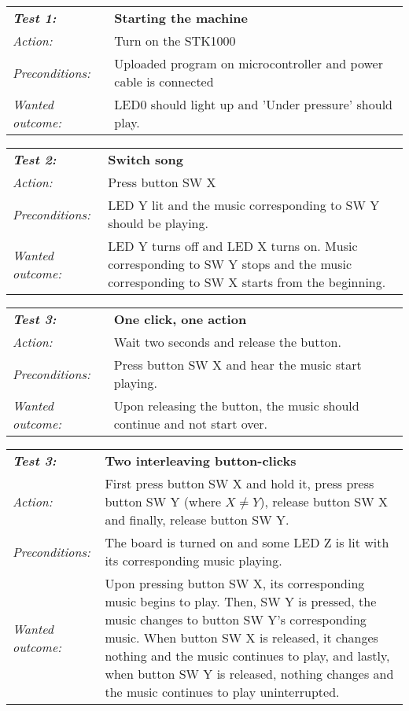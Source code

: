 \begin{tabular}[h]{|lp{12cm}|} \hline
\textbf{\emph{Test 1:}} 		& \textbf{Starting the machine}\\
\emph{Action:} 		& Turn on the STK1000\\
\emph{Preconditions:}	& Uploaded program on microcontroller and power cable is connected\\
\emph{Wanted outcome:}	& LED0 should light up and 'Under pressure'  should play. \\ \hline
\end{tabular}

\vspace{1cm}

\begin{tabular}[h]{|lp{12cm}|} \hline
\textbf{\emph{Test 2:}} 		& \textbf{Switch song}\\
\emph{Action:} 		& Press button SW X\\
\emph{Preconditions:}	& LED Y lit and the music corresponding to SW Y should be playing.\\
\emph{Wanted outcome:}	& LED Y turns off and LED X turns on. Music corresponding to SW Y stops and the music corresponding to SW X starts from the beginning.\\ \hline
\end{tabular}

\vspace{1cm}

\begin{tabular}[h]{|lp{12cm}|} \hline
\textbf{\emph{Test 3:}} 		& \textbf{One click, one action}\\
\emph{Action:} 		& Wait two seconds and release the button.\\
\emph{Preconditions:}	& Press button SW X and hear the music start playing.\\
\emph{Wanted outcome:}	& Upon releasing the button, the music should continue and not start over. \\ \hline
\end{tabular}

\vspace{1cm}

\begin{tabular}[h]{|lp{12cm}|} \hline
\textbf{\emph{Test 3:}} 		& \textbf{Two interleaving button-clicks}\\
\emph{Action:} 		& First press button SW X and hold it,  press press button SW Y (where $X \neq Y$), release button SW X and finally, release button SW Y. \\
\emph{Preconditions:}	& The board is turned on and some LED Z is lit with its corresponding music playing.\\
\emph{Wanted outcome:}	& Upon pressing button SW X, its corresponding music begins to play. Then, SW Y is pressed, the music changes to button SW Y's corresponding music. When button SW X is released, it changes nothing and the music continues to play, and lastly, when button SW Y is released, nothing changes and the music continues to play uninterrupted. \\ \hline
\end{tabular}

